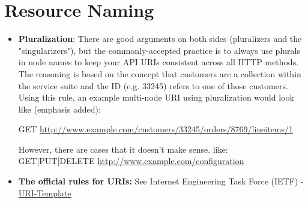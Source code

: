 \section{Resource Naming}
\begin{itemize}
	\item \textbf{Pluralization}:\newline
		There are good arguments on both sides (pluralizers and the "singularizers"), but the commonly-accepted practice is to always use plurals in node names to keep your API URIs consistent across all HTTP methods. The reasoning is based on the concept that customers are a collection within the service suite and the ID (e.g. 33245) refers to one of those customers.
		Using this rule, an example multi-node URI using pluralization would look like (emphasis added):
		
		GET \url{http://www.example.com/customers/33245/orders/8769/lineitems/1}

		However, there are cases that it doesn't make sense. like:\newline
		GET|PUT|DELETE \url{http://www.example.com/configuration}
	\item \textbf{The official rules for URIs:}\newline
		See Internet Engineering Task Force (IETF) - \href{http://tools.ietf.org/html/rfc6570}{URI-Template}

\end{itemize}